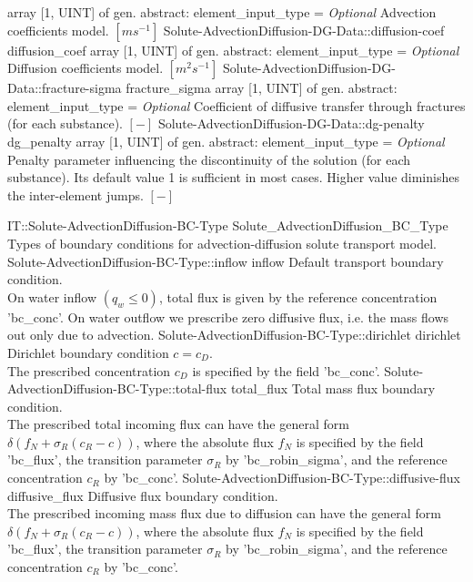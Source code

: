 \begin{RecordType}
			{{array [1, UINT] of }{gen. abstract: }}{{element{\_}input{\_}type}{ = }}
			{ \it{Optional}}
			{{{Advection coefficients model. }{$[ms^{-1}]$}%
}}
		\RecKey
			{Solute-AdvectionDiffusion-DG-Data::diffusion-coef}
			{diffusion{\_}coef}
			{{array [1, UINT] of }{gen. abstract: }}{{element{\_}input{\_}type}{ = }}
			{ \it{Optional}}
			{{{Diffusion coefficients model. }{$[m^{2}s^{-1}]$}%
}}
		\RecKey
			{Solute-AdvectionDiffusion-DG-Data::fracture-sigma}
			{fracture{\_}sigma}
			{{array [1, UINT] of }{gen. abstract: }}{{element{\_}input{\_}type}{ = }}
			{ \it{Optional}}
			{{{Coefficient of diffusive transfer through fractures (for each substance). }{$[-]$}%
}}
		\RecKey
			{Solute-AdvectionDiffusion-DG-Data::dg-penalty}
			{dg{\_}penalty}
			{{array [1, UINT] of }{gen. abstract: }}{{element{\_}input{\_}type}{ = }}
			{ \it{Optional}}
			{{{Penalty parameter influencing the discontinuity of the solution (for each substance). Its default value 1 is sufficient in most cases.
Higher value diminishes the inter-element jumps. }{$[-]$}%
}}
\end{RecordType}
\begin{SelectionType}
	{IT::Solute-AdvectionDiffusion-BC-Type}
	{Solute{\_}AdvectionDiffusion{\_}BC{\_}Type}
	{{{Types of boundary conditions for advection-diffusion solute transport model.}%
}}
		\SelectionItem
			{Solute-AdvectionDiffusion-BC-Type::inflow}
			{inflow}
			{{{Default transport boundary condition.}\\{
On water inflow }{$(q_w \le 0)$}{, total flux is given by the reference concentration 'bc{\_}conc'. On water outflow we prescribe zero diffusive flux, i.e. the mass flows out only due to advection.}%
}}
		\SelectionItem
			{Solute-AdvectionDiffusion-BC-Type::dirichlet}
			{dirichlet}
			{{{Dirichlet boundary condition }{$ c = c_D $}{.}\\{
The prescribed concentration }{$c_D$}{ is specified by the field 'bc{\_}conc'.}%
}}
		\SelectionItem
			{Solute-AdvectionDiffusion-BC-Type::total-flux}
			{total{\_}flux}
			{{{Total mass flux boundary condition.}\\{
The prescribed total incoming flux can have the general form }{$\delta(f_N+\sigma_R(c_R-c) )$}{, where the absolute flux }{$f_N$}{ is specified by the field 'bc{\_}flux', the transition parameter }{$\sigma_R$}{ by 'bc{\_}robin{\_}sigma', and the reference concentration }{$c_R$}{ by 'bc{\_}conc'.}%
}}
		\SelectionItem
			{Solute-AdvectionDiffusion-BC-Type::diffusive-flux}
			{diffusive{\_}flux}
			{{{Diffusive flux boundary condition.}\\{
The prescribed incoming mass flux due to diffusion can have the general form }{$\delta(f_N+\sigma_R(c_R-c) )$}{, where the absolute flux }{$f_N$}{ is specified by the field 'bc{\_}flux', the transition parameter }{$\sigma_R$}{ by 'bc{\_}robin{\_}sigma', and the reference concentration }{$c_R$}{ by 'bc{\_}conc'.}%
}}
\end{SelectionType}
